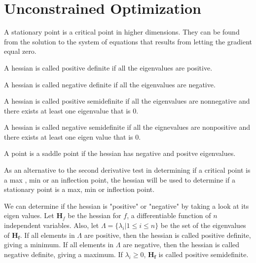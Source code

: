 \section{Unconstrained Optimization}
\begin{definition}
    A \alert{stationary point} is a critical point in higher dimensions. They
    can be found from the solution to the system of equations that results
    from letting the gradient equal zero.
\end{definition}
\begin{definition}
    A hessian is called \alert{positive definite} if all the eigenvalues
    are positive.
\end{definition}
\begin{definition}
    A hessian is called \alert{negative definite} if all the eigenvalues
    are negative.
\end{definition}
\begin{definition}
    A hessian is called \alert{positive semidefinite} if all the eigenvalues
    are nonnegative and there exists at least one eigenvalue that is $0$.
\end{definition}
\begin{definition}
    A hessian is called \alert{negative semidefinite} if all the eignevalues
    are nonpositive and there exists at least one eigen value that is $0$.
\end{definition}
\begin{definition}
    A point is a \alert{saddle point} if the hessian has negative and positve
    eigenvalues.
\end{definition}
As an alternative to the second derivative test in determining if a critical
point is a max , min or an inflection point, the \alert{hessian} will be used 
to determine if a stationary point is a max, min or inflection point.
\begin{theorem}

\end{theorem}
We can determine if the hessian is "positive" or "negative" by taking a look
at its eigen values. Let $\mathbf{H}_f$ be the hessian for $f$, a differentiable
function of $n$ independent variables. Also, let $\Lambda = \{\lambda_i | 1 \leq i \leq n\}$
be the set of the eigenvalues of $\mathbf{H_f}$. If all elements in $\Lambda$ are positive,
then the hessian is called \alert{positive definite}, giving a minimum. If all 
elements in $\Lambda$ are negative, then the hessian is called \alert{negative definite},
giving a maximum. If $\lambda_i \geq 0$, $\mathbf{H_f}$ is called \alert{positive semidefinite}.
